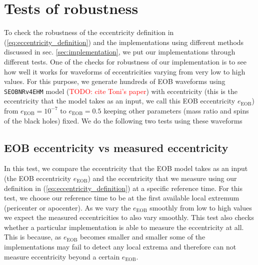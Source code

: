 \documentclass[aps,prd,amsmath,floats,floatfix, twocolumn,
superscriptaddress,nofootinbib,showpacs]{revtex4-1}
\newcommand{\red}{\textcolor{red}}
\newcommand{\TODO}[1]{\red{TODO: #1}}
\newcommand{\eEOB}{e_{\text{EOB}}}
\begin{document}
\section{Tests of robustness}
\label{sec:tests}
To check the robustness of the eccentricity definition in
(\ref{eq:eccentricity_definition}) and the implementations using
different methods discussed in sec. \ref{sec:implementation}, we put
our implementations through different tests. One of the checks for
robustness of our implementation is to see how well it works for
waveforms of eccentricities varying from very low to high values. For
this purpose, we generate hundreds of EOB waveforms using
\texttt{SEOBNRv4EHM} model (\TODO{cite Toni's paper}) with
eccentricity (this is the eccentricity that the model takes as an
input, we call this EOB eccentricity $\eEOB$) from
$\eEOB = 10^{-7}$ to $\eEOB = 0.5$ keeping other
parameters (mass ratio and spins of the black holes) fixed. We do the
following two tests using these waveforms

\subsection{EOB eccentricity vs measured eccentricity}
\label{sec:eob-eccentricity-vs-measured-eccentricity} In this test, we
compare the eccentricity that the EOB model takes as an input (the EOB
eccentricity $\eEOB$) and the eccentricity that we measure
using our definition in (\ref{eq:eccentricity_definition}) at a
specific reference time. For this test, we choose our reference time
to be at the first available local extremum (pericenter or
apocenter). As we vary the $\eEOB$ smoothly from low to high
values we expect the measured eccentricities to also vary smoothly.
This test also checks whether a particular implementation is able to
measure the eccentricity at all. This is because, as $\eEOB$
becomes smaller and smaller some of the implementations may fail to
detect any local extrema and therefore can not measure eccentricity
beyond a certain $\eEOB$.
\end{document}

